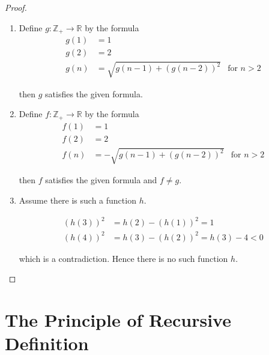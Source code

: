 \begin{proof}
    \begin{enumerate}[label={(\alph*)}]
        \item Define $g: \mathbb{Z}_{+}\to \mathbb{R}$ by the formula
              \begin{align*}
                  g(1) & = 1                                                   \\
                  g(2) & = 2                                                   \\
                  g(n) & = \sqrt{g(n-1) + {(g(n-2))}^{2}} & \text{for $n > 2$}
              \end{align*}

              then $g$ satisfies the given formula.
        \item Define $f: \mathbb{Z}_{+}\to \mathbb{R}$ by the formula
              \begin{align*}
                  f(1) & = 1                                                    \\
                  f(2) & = 2                                                    \\
                  f(n) & = -\sqrt{g(n-1) + {(g(n-2))}^{2}} & \text{for $n > 2$}
              \end{align*}

              then $f$ satisfies the given formula and $f\ne g$.
        \item Assume there is such a function $h$.

              \begin{align*}
                  {(h(3))}^{2} & = h(2) - {(h(1))}^{2} = 1            \\
                  {(h(4))}^{2} & = h(3) - {(h(2))}^{2} = h(3) - 4 < 0
              \end{align*}

              which is a contradiction. Hence there is no such function $h$.
    \end{enumerate}
\end{proof}

\section{The Principle of Recursive Definition}

